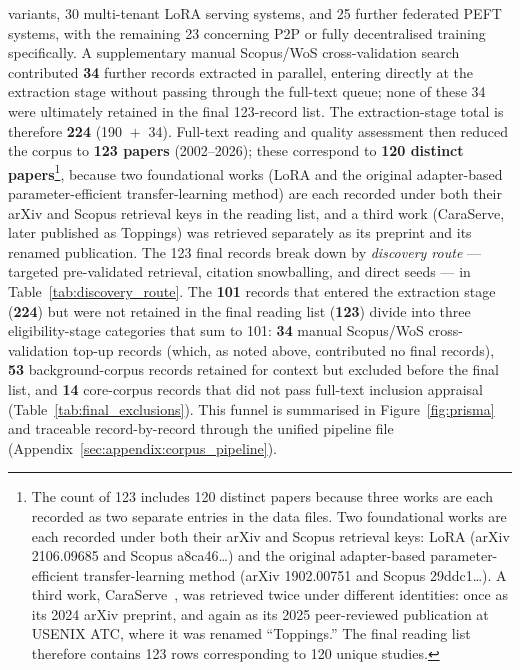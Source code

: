variants, 30 multi-tenant LoRA serving systems, and 25 further federated
PEFT systems, with the remaining 23 concerning P2P or fully decentralised
training specifically.
A supplementary manual Scopus/WoS cross-validation search contributed
\textbf{34} further records extracted in parallel, entering directly at the
extraction stage without passing through the full-text queue; none of these
34 were ultimately retained in the final 123-record list. The extraction-stage
total is therefore \textbf{224} (190 ${}+{}$ 34). Full-text reading and quality assessment
then reduced the corpus to \textbf{123 papers} (2002--2026); these correspond
to \textbf{120 distinct papers}\footnote{The count of 123 includes 120 distinct
papers because three works are each recorded as two separate entries in the
data files. Two foundational works are each recorded under both their arXiv
and Scopus retrieval keys: LoRA (arXiv 2106.09685 and Scopus a8ca46\ldots) and
the original adapter-based parameter-efficient transfer-learning method (arXiv
1902.00751 and Scopus 29ddc1\ldots). A third work, CaraServe~\cite{Li2024CaraServe},
was retrieved twice under different identities: once as its 2024 arXiv
preprint, and again as its 2025 peer-reviewed publication at USENIX ATC, where
it was renamed ``Toppings.'' The final reading list therefore contains
123 rows corresponding to 120 unique studies.}, because two foundational works
(LoRA and the original adapter-based parameter-efficient transfer-learning
method) are each recorded under both their arXiv and Scopus retrieval keys in
the reading list, and a third work (CaraServe, later published as Toppings)
was retrieved separately as its preprint and its renamed publication.
The 123 final records break down by \emph{discovery route} --- targeted
pre-validated retrieval, citation snowballing, and direct seeds --- in
Table~\ref{tab:discovery_route}. The \textbf{101} records that entered the
extraction stage (\textbf{224}) but were not retained in the final reading list
(\textbf{123}) divide into three eligibility-stage categories that sum to 101:
\textbf{34} manual Scopus/WoS cross-validation top-up records (which, as noted
above, contributed no final records), \textbf{53} background-corpus records
retained for context but excluded before the final list, and \textbf{14}
core-corpus records that did not pass full-text inclusion appraisal
(Table~\ref{tab:final_exclusions}). This funnel is summarised in
Figure~\ref{fig:prisma} and traceable record-by-record through the unified
pipeline file (Appendix~\ref{sec:appendix:corpus_pipeline}).


